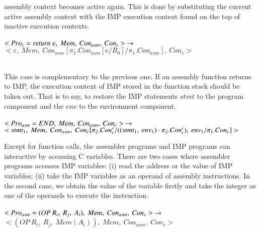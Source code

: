 \documentclass[conference]{IEEEtran}
\begin{document}
assembly context becomes active again. This is done by substituting the current active
assembly context with the IMP execution context found on the top of inactive execution
contexts.\\ \\
$<Pro_c=return~e,~Mem,~Con_{asm},~Con_c>~\rightarrow\\ \\$
$<\varepsilon,~Mem,~Con_{asm}[\pi_1.Con_{asm}[e/R_0]/\pi_1.Con_{asm}],~Con_c>$\\ \\
\par This case is complementary to the previous one. If an assembly function returns to IMP, the execution context of IMP stored in the function stack should be taken out. That is to say, to restore the IMP statements $stmt$ to the program component and the $env$ to the environment component.  \\ \\
$<Pro_{asm}=END,~Mem,~Con_{asm},~Con_c>~\rightarrow\\ \\$
$<stmt_1,~Mem,~Con_{asm},~Con_c[\pi_2.Con_c'/((stmt_1,~env_1)\cdot \pi_2.Con_c'),~env_1/\pi_1.Con_c]>\\ \\$
\par Except for function calls, the assembler programs and IMP programs can interactive by accessing C variables. There are two cases where assembler programs accesses IMP variables: (i) read the address or the value of IMP variables; (ii) take the IMP variables as an operand of assembly instructions. In the second case, we obtain the value of the variable firstly and take the integer as one of the operands to execute the instruction.\\ \\
$<Pro_{asm}=(OP~R_i,~R_j,~A_i),~Mem,~Con_{asm},~Con_c>~\rightarrow\\ \\$
$<(OP~R_i,~R_j,~Mem(A_i)),~Mem,~Con_{asm},~Con_c>$\\ \\
\end{document}
